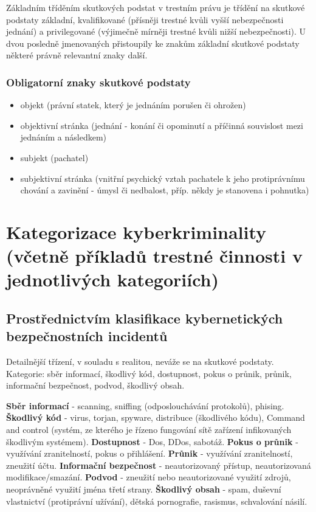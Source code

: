 Základním tříděním skutkových podstat v trestním právu je třídění na skutkové podstaty základní, kvalifikované (přísněji trestné kvůli vyšší nebezpečnosti jednání) a privilegované (výjimečně mírněji trestné kvůli nižší nebezpečnosti). U dvou posledně jmenovaných přistoupily ke znakům základní skutkové podstaty některé právně relevantní znaky další.

\subsubsection{Obligatorní znaky skutkové podstaty}
\begin{itemize}
    \item objekt (právní statek, který je jednáním porušen či ohrožen)
    \item objektivní stránka (jednání - konání či opominutí a příčinná souvislost mezi jednáním a následkem)
    \item subjekt (pachatel)
    \item subjektivní stránka (vnitřní psychický vztah pachatele k jeho protiprávnímu chování a zavinění - úmysl či nedbalost, příp. někdy je stanovena i pohnutka)
\end{itemize}




\newpage
\section{Kategorizace kyberkriminality (včetně příkladů trestné činnosti v jednotlivých kategoriích)}

\subsection{Prostřednictvím klasifikace kybernetických bezpečnostních incidentů} 
Detailnější třízení, v souladu s realitou, neváže se na skutkové podstaty. Kategorie: sběr informací, škodlivý kód, dostupnost, pokus o průnik, průnik,  informační bezpečnost, podvod, škodlivý obsah.

\textbf{Sběr informací} - scanning, sniffing (odposlouchávání protokolů), phising. \textbf{Škodlivý kód} - virus, torjan, spyware, distribuce (škodlivého kódu), Command and control (systém, ze kterého je řízeno fungování sítě zařízení infikovaných škodlivým systémem). \textbf{Dostupnost} - Dos, DDos, sabotáž. \textbf{Pokus o průnik} - využívání zranitelností, pokus o přihlášení. \textbf{Průnik} - využívání zranitelností, zneužití účtu. \textbf{Informační bezpečnost} - neautorizovaný přístup, neautorizovaná modifikace/smazání. \textbf{Podvod} - zneužití nebo neautorizované využití zdrojů, neoprávněné využití jména třetí strany. \textbf{Škodlivý obsah} - spam, duševní vlastnictví (protiprávní užívání), dětská pornografie, rasismus, schvalování násilí.

